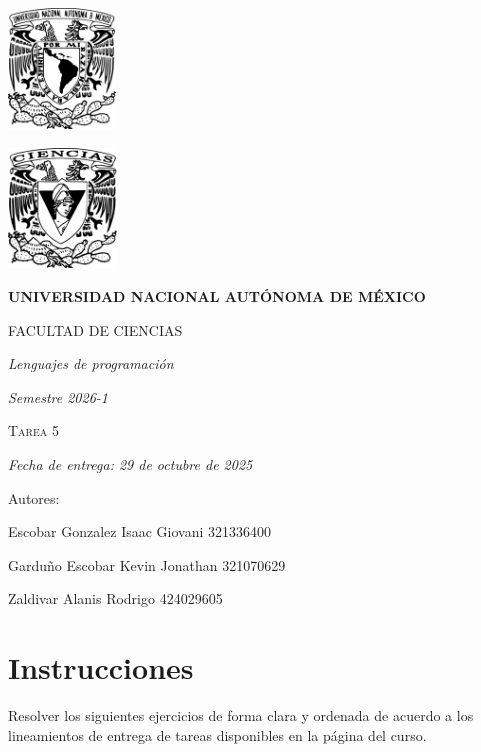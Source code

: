 \documentclass[11pt]{article}
\begin{document}
\begin{titlepage}
    \centering
    \vspace{2cm}
    {\includegraphics[height=3.2cm]{../logo_unam.png}}
    \hfill
    {\includegraphics[height=3.2cm]{../logo_fc.png}\par}
    \vspace{1cm}
    {\bfseries\LARGE UNIVERSIDAD NACIONAL AUTÓNOMA DE MÉXICO \par}
    \vspace{0.7cm}
    {\scshape\Large FACULTAD DE CIENCIAS \par}
    \vspace{1cm}
    {\itshape\Large Lenguajes de programación \par}
    \vspace{0.5cm}
    {\itshape\Large Semestre 2026-1 \par}
    \vspace{2cm}
    {\scshape\Huge Tarea 5 \par}
    \vspace{1cm}
    {\itshape\Large Fecha de entrega: 29 de octubre de 2025 \par}
    \vspace{2cm}
    {\Large Autores: \par}
    \vspace{0.4cm}
    {\Large Escobar Gonzalez Isaac Giovani \hspace{1cm} 321336400 \par}
    {\Large Garduño Escobar Kevin Jonathan \hspace{0.5cm} 321070629 \par}
    {\Large Zaldivar Alanis Rodrigo \hspace{2.75cm} 424029605 \par}
\end{titlepage}
\section*{Instrucciones}
\noindent Resolver los siguientes ejercicios de forma clara y ordenada de acuerdo a los lineamientos de entrega de tareas disponibles en la página del curso.\\
\end{document}
